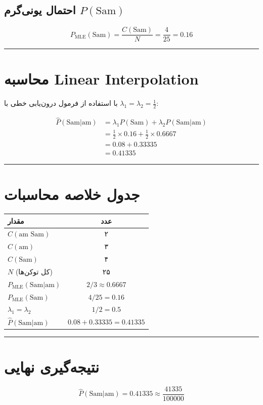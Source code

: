 \documentclass[11pt,a4paper]{article}
\newcommand{\en}[1]{\textenglish{#1}}
\newcommand{\separator}{\vspace{1em}\noindent\rule{\linewidth}{0.4pt}\vspace{1em}}
\begin{document}
\subsection*{احتمال یونی‌گرم $P(\text{Sam})$}
\[
P_{\text{MLE}}(\text{Sam}) = \frac{C(\text{Sam})}{N} = \frac{4}{25} = 0.16
\]

\separator
\section{محاسبه \en{Linear Interpolation}}
با استفاده از فرمول درون‌یابی خطی با $\lambda_1 = \lambda_2 = \frac{1}{2}$:

\[
\begin{aligned}
\hat{P}(\text{Sam}|\text{am}) &= \lambda_1 P(\text{Sam}) + \lambda_2 P(\text{Sam}|\text{am}) \\
&= \frac{1}{2} \times 0.16 + \frac{1}{2} \times 0.6667 \\
&= 0.08 + 0.33335 \\
&= 0.41335
\end{aligned}
\]

\separator
\section{جدول خلاصه محاسبات}
\begin{center}
\begin{tabular}{|l|c|}
\hline
\textbf{مقدار} & \textbf{عدد} \\
\hline
$C(\text{am Sam})$ & ۲ \\
\hline
$C(\text{am})$ & ۳ \\
\hline
$C(\text{Sam})$ & ۴ \\
\hline
$N$ (کل توکن‌ها) & ۲۵ \\
\hline
$P_{\text{MLE}}(\text{Sam}|\text{am})$ & $2/3 \approx 0.6667$ \\
\hline
$P_{\text{MLE}}(\text{Sam})$ & $4/25 = 0.16$ \\
\hline
$\lambda_1 = \lambda_2$ & $1/2 = 0.5$ \\
\hline
$\hat{P}(\text{Sam}|\text{am})$ & $0.08 + 0.33335 = 0.41335$ \\
\hline
\end{tabular}
\end{center}

\separator
\section{نتیجه‌گیری نهایی}
\[
\boxed{\hat{P}(\text{Sam}|\text{am}) = 0.41335 \approx \frac{41335}{100000}}
\]
\end{document}
